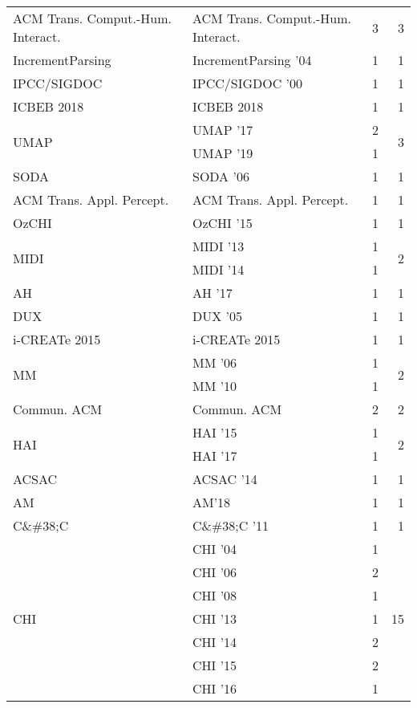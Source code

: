 \begin{table*}[t]
\begin{tabular}{llrr}
\multirow{1}{*}{ACM Trans. Comput.-Hum. Interact.} & ACM Trans. Comput.-Hum. Interact. & 3 & \multirow{1}{*}{3}\\
\multirow{1}{*}{IncrementParsing } & IncrementParsing '04 & 1 & \multirow{1}{*}{1}\\
\multirow{1}{*}{IPCC/SIGDOC } & IPCC/SIGDOC '00 & 1 & \multirow{1}{*}{1}\\
\multirow{1}{*}{ICBEB 2018} & ICBEB 2018 & 1 & \multirow{1}{*}{1}\\
\multirow{2}{*}{UMAP } & UMAP '17 & 2 & \multirow{2}{*}{3}\\
& UMAP '19 & 1 &\\
\multirow{1}{*}{SODA } & SODA '06 & 1 & \multirow{1}{*}{1}\\
\multirow{1}{*}{ACM Trans. Appl. Percept.} & ACM Trans. Appl. Percept. & 1 & \multirow{1}{*}{1}\\
\multirow{1}{*}{OzCHI } & OzCHI '15 & 1 & \multirow{1}{*}{1}\\
\multirow{2}{*}{MIDI } & MIDI '13 & 1 & \multirow{2}{*}{2}\\
& MIDI '14 & 1 &\\
\multirow{1}{*}{AH } & AH '17 & 1 & \multirow{1}{*}{1}\\
\multirow{1}{*}{DUX } & DUX '05 & 1 & \multirow{1}{*}{1}\\
\multirow{1}{*}{i-CREATe 2015} & i-CREATe 2015 & 1 & \multirow{1}{*}{1}\\
\multirow{2}{*}{MM } & MM '06 & 1 & \multirow{2}{*}{2}\\
& MM '10 & 1 &\\
\multirow{1}{*}{Commun. ACM} & Commun. ACM & 2 & \multirow{1}{*}{2}\\
\multirow{2}{*}{HAI } & HAI '15 & 1 & \multirow{2}{*}{2}\\
& HAI '17 & 1 &\\
\multirow{1}{*}{ACSAC } & ACSAC '14 & 1 & \multirow{1}{*}{1}\\
\multirow{1}{*}{AM} & AM'18 & 1 & \multirow{1}{*}{1}\\
\multirow{1}{*}{C\&\#38;C } & C\&\#38;C '11 & 1 & \multirow{1}{*}{1}\\
\multirow{11}{*}{CHI } & CHI '04 & 1 & \multirow{11}{*}{15}\\
& CHI '06 & 2 &\\
& CHI '08 & 1 &\\
& CHI '13 & 1 &\\
& CHI '14 & 2 &\\
& CHI '15 & 2 &\\
& CHI '16 & 1 &\\

\end{tabular}
\end{table*}
